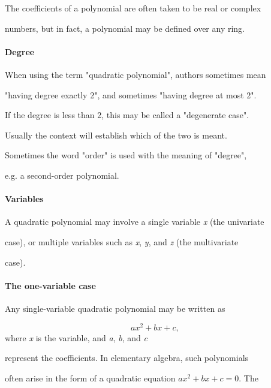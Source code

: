 The coefficients of a polynomial are often taken to be real or complex

numbers, but in fact, a polynomial may be defined over any ring.



\paragraph{Degree}



When using the term "quadratic polynomial", authors sometimes mean

"having degree exactly 2", and sometimes "having degree at most 2".

If the degree is less than 2, this may be called a "degenerate case".

Usually the context will establish which of the two is meant.



Sometimes the word "order" is used with the meaning of "degree",

e.g. a second-order polynomial.



\paragraph{Variables}



A quadratic polynomial may involve a single variable \textit{x} (the univariate

case), or multiple variables such as \textit{x}, \textit{y}, and \textit{z} (the multivariate

case).



\paragraph{The one-variable case}



Any single-variable quadratic polynomial may be written as



$$ax^2 + bx + c,\,$$ where \textit{x} is the variable, and \textit{a}, \textit{b}, and \textit{c}

represent the coefficients. In elementary algebra, such polynomials

often arise in the form of a quadratic equation $ax^2 + bx + c = 0$. The

